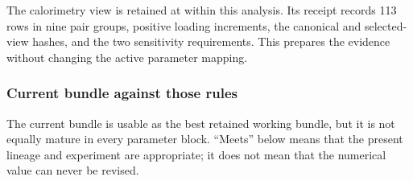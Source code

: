 \documentclass[10pt,oneside]{scrartcl}
\begin{document}
The calorimetry view is retained at
 within this analysis.
Its receipt records 113 rows in nine pair groups, positive loading increments,
the canonical and selected-view hashes, and the two sensitivity requirements.
This prepares the evidence without changing the active parameter mapping.

\subsubsection{Current bundle against those rules}

The current bundle is usable as the best retained working bundle, but it is not
equally mature in every parameter block. ``Meets'' below means that the present
lineage and experiment are appropriate; it does not mean that the numerical
value can never be revised.
\end{document}
